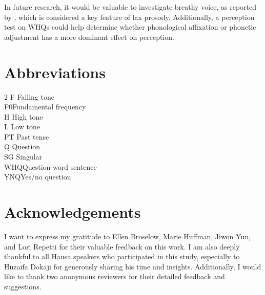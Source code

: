 \documentclass[output=paper,colorlinks,citecolor=brown
]{langscibook}
\begin{document}
In future research, it would be valuable to investigate breathy voice, as reported by \citet{dresel1977}, which is considered a key feature of lax prosody. Additionally, a perception test on WHQs could help determine whether phonological affixation or phonetic adjustment has a more dominant effect on perception.
\section*{Abbreviations}
\begin{multicols}{2}
\noindent
F  \quad Falling tone\\
F0\quad Fundamental frequency\\
H \quad High tone \\
L \quad  Low tone\\
PT \quad Past tense\\
Q  \quad Question\\
SG \quad Singular\\ 
WHQ\quad  Question-word sentence\\
YNQ\quad  Yes/no question

\end{multicols}

\section*{Acknowledgements}
I want to express my gratitude to Ellen Broselow, Marie Huffman, Jiwon Yun, and Lori Repetti for their valuable feedback on this work. I am also deeply thankful to all Hausa speakers who participated in this study, especially to Huzaifa Dokaji for generously sharing his time and insights. Additionally, I would like to thank two anonymous reviewers for their detailed feedback and suggestions.

\sloppy %

\printbibliography[heading=subbibliography,notkeyword=this]
\end{document}
